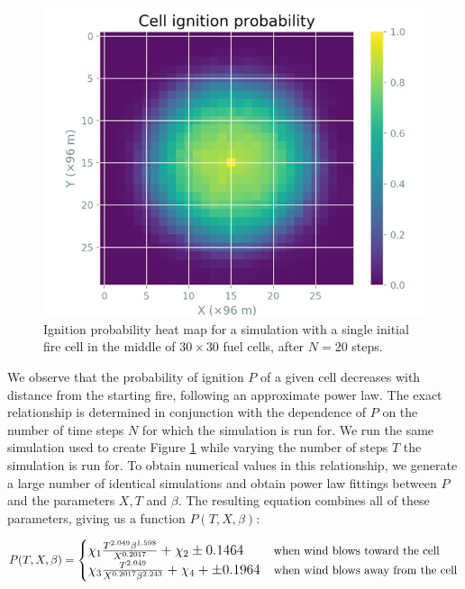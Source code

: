 \begin{figure}[h!]
\begin{center}
\includegraphics[scale=0.5]{Figures/h5.png}
\caption{Ignition probability heat map for a simulation with a single initial fire cell in the middle of $30\times30$ fuel cells, after $N=20$ steps.} 
\label{f48}
\end{center}
\end{figure} 

\noindent We observe that the probability of ignition $P$ of a given cell decreases with distance from the starting fire, following an approximate power law. The exact relationship is determined in conjunction with the dependence of $P$ on the number of time steps $N$ for which the simulation is run for. We run the same simulation used to create Figure \ref{f48} while varying the number of steps $T$ the simulation is run for. To obtain numerical values in this relationship, we generate a large number of identical simulations and obtain power law fittings between $P$ and the parameters $X,T$ and $\beta$. The resulting equation combines all of these parameters, giving us a function $P(T,X,\beta)$:

\begin{equation}
    \large
    P(T,X,\beta) = \begin{cases}\chi_1 \frac{T^{2.049} \beta^{1.598}}{X^{0.2017}} + \chi_2 \pm 0.1464& \mbox{\normalsize when wind blows toward the cell}\\
    \chi_3 \frac{T^{2.049}} {X^{0.2017} \beta^{2.243}} + \chi_4 + \pm 0.1964& \mbox{\normalsize when wind blows away from the cell}
    \end{cases}
    \label{p2}
\end{equation}

